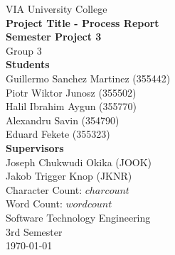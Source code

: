 \thispagestyle{empty}
\vspace*{0.15\textheight}
\begin{center}
    {\Large VIA University College}\\[2em]
    {\huge \textbf{Project Title - Process Report}}\\[0.5em]
    {\Large \textbf{Semester Project 3}}\\[0.5em]
    {\Large Group 3}\\[3em]
    {\large \textbf{Students}}\\[0.5em]
    {\large Guillermo Sanchez Martinez (355442)}\\[0.5em]
    {\large Piotr Wiktor Junosz (355502)}\\[0.5em]
    {\large Halil Ibrahim Aygun (355770)}\\[0.5em]
    {\large Alexandru Savin (354790)}\\[0.5em]
    {\large Eduard Fekete (355323)}\\[2em]
    {\large \textbf{Supervisors}}\\[0.5em]
    {\large Joseph Chukwudi Okika (JOOK)}\\[0.5em]
    {\large Jakob Trigger Knop (JKNR)}\\[2em]        
    {\large Character Count: $charcount$}\\[0.5em]
    {\large Word Count: $wordcount$}\\[2em]
    {\Large Software Technology Engineering}\\[1em]
    {\Large 3rd Semester}\\[1em]
    {\large \today}\\[1em]
\end{center}
\vfill
\clearpage